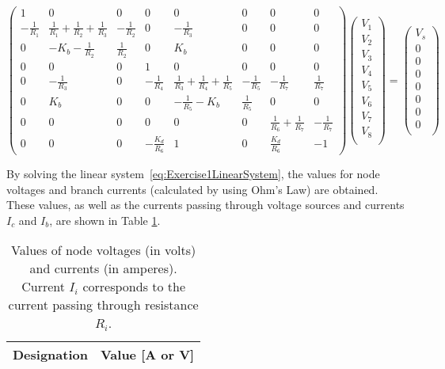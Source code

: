 \begin{equation}
  \begin{pmatrix}
    1 & 0 & 0 & 0 & 0 & 0 & 0 & 0 \\
    -\frac{1}{R_1} & \frac{1}{R_1}+\frac{1}{R_2}+\frac{1}{R_3} & -\frac{1}{R_2} & 0 & -\frac{1}{R_3} & 0 & 0 & 0 \\
    0 & -K_b-\frac{1}{R_2} & \frac{1}{R_2} & 0 & K_b & 0 & 0 & 0 \\
    0 & 0 & 0 & 1 & 0 & 0 & 0 & 0 \\
    0 & -\frac{1}{R_3} & 0 & -\frac{1}{R_4} & \frac{1}{R_3}+\frac{1}{R_4}+\frac{1}{R_5} & -\frac{1}{R_5} & -\frac{1}{R_7} & \frac{1}{R_7} \\
    0 & K_b & 0 & 0 & -\frac{1}{R_5}-K_b & \frac{1}{R_5} & 0 & 0 \\
    0 & 0 & 0 & 0 & 0 & 0 & \frac{1}{R_6}+\frac{1}{R_7} & -\frac{1}{R_7} \\
    0 & 0 & 0 & -\frac{K_d}{R_6} & 1 & 0 & \frac{K_d}{R_6} & -1
  \end{pmatrix}
  \begin{pmatrix}
    V_1  \\
    V_2  \\
    V_3  \\
    V_4  \\
    V_5  \\
    V_6  \\
    V_7  \\
    V_8  \\
  \end{pmatrix}
  =
  \begin{pmatrix}
    V_s \\
    0   \\
    0   \\
    0   \\
    0   \\
    0   \\
    0   \\
    0   \\
  \end{pmatrix}
  \label{eq:Exercise1LinearSystem}
\end{equation}

By solving the linear system~\ref{eq:Exercise1LinearSystem}, the values for node voltages and branch currents (calculated by using Ohm's Law) are obtained. These values, as well as the currents passing through voltage sources and currents $I_c$ and $I_b$, are shown in Table \ref{tab:Exercise1Theoretical}.

\begin{table}[H]
  \centering
  \begin{tabular}{|c|c|}
    \hline
        {\bf Designation} & {\bf Value [A or V]} \\ \hline
        
  \end{tabular}
  \caption{Values of node voltages (in volts) and currents (in amperes). Current $I_i$ corresponds to the current passing through resistance $R_i$.}
  \label{tab:Exercise1Theoretical}
\end{table}


